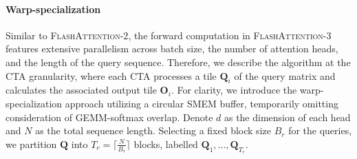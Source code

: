 \paragraph{Warp-specialization}
Similar to \textsc{FlashAttention-2}, the forward computation in \textsc{FlashAttention-3} features extensive parallelism across batch size, the number of attention heads, and the length of the query sequence. Therefore, we describe the algorithm at the CTA granularity, where each CTA processes a tile $\mathbf{Q}_i$ of the query matrix and calculates the associated output tile $\mathbf{O}_i$. For clarity, we introduce the warp-specialization approach utilizing a circular SMEM buffer, temporarily omitting consideration of GEMM-softmax overlap. Denote $d$ as the dimension of each head and $N$ as the total sequence length. Selecting a fixed block size $B_r$ for the queries, we partition $\mathbf{Q}$ into $T_r = \lceil \frac{N}{B_r} \rceil$ blocks, labelled $\mathbf{Q}_1, ..., \mathbf{Q}_{T_r}$.

